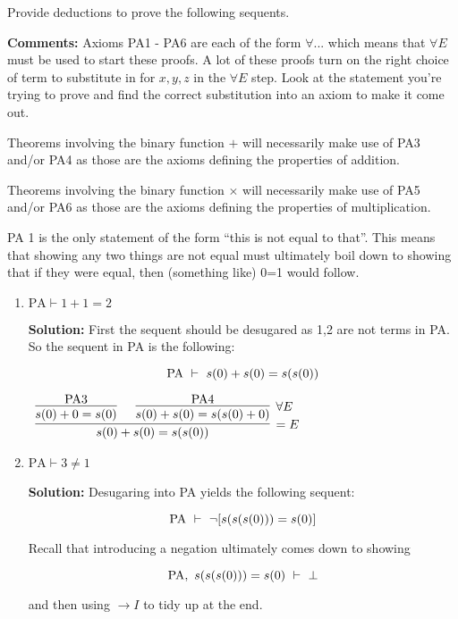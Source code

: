 \documentclass[11pt]{report}
\begin{document}
\begin{enumerate}
	Provide deductions to prove the following sequents.

	{\bf Comments:} Axioms PA1 - PA6 are each of the form $\forall ...$ which means that $\forall E$ must be used to start these proofs. A lot of these proofs turn on the right choice of term to substitute in for $x,y,z$ in the $\forall E$ step. Look at the statement you're trying to prove and find the correct substitution into an axiom to make it come out. 

	Theorems involving the binary function $+$ will necessarily make use of PA3 and/or PA4 as those are the axioms defining the properties of addition. 

	Theorems involving the binary function $\times$ will necessarily make use of PA5 and/or PA6 as those are the axioms defining the properties of multiplication. 

	PA 1 is the only statement of the form ``this is not equal to that''. This means that showing any two things are not equal must ultimately boil down to showing that if they were equal, then (something like) 0=1 would follow.
	
	\begin{enumerate}
		\item $\text{PA} \vdash 1 + 1 = 2$
		
		{\bf Solution:} First the sequent should be desugared as 1,2 are not terms in PA. So the sequent in PA is the following: 

		$$ \text{PA} \ \vdash \ s(0) + s(0) = s(s(0))$$

			\begin{center}
				$\begin{array}{c}
					\infer[=E]{s(0) + s(0) = s(s(0))}
						{\infer[]{s(0) + 0 = s(0)}
							{\PA 3}
						&
						\infer[\forall E]{s(0) + s(0) = s(s(0) + 0)}
							{\PA 4}}
				\end{array}$
			\end{center}

		\item $\text{PA} \vdash 3 \neq 1$
		
		{\bf Solution:} Desugaring into PA yields the following sequent:

		$$ \text{PA} \ \vdash \ \lnot[s(s(s(0))) = s(0)]$$

		Recall that introducing a negation ultimately comes down to showing 

		$$ \PA, \ s(s(s(0))) = s(0) \ \vdash \ \bot$$

		and then using $\to I$ to tidy up at the end. 


\end{enumerate}
\end{enumerate}
\end{document}
